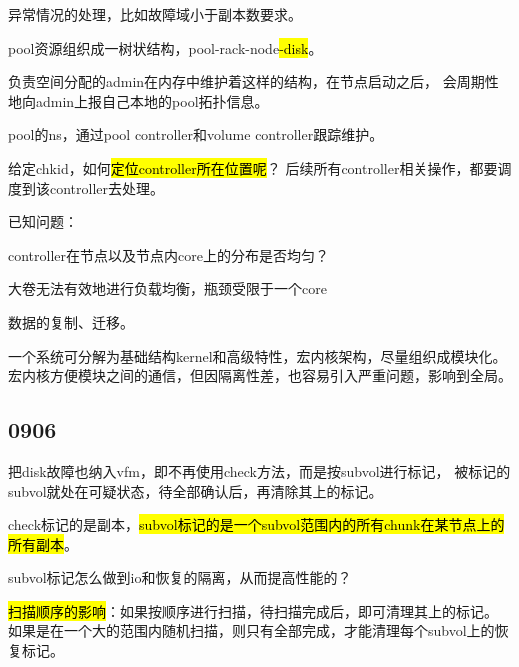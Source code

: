 异常情况的处理，比如故障域小于副本数要求。

pool资源组织成一树状结构，pool-rack-node\hl{-disk}。

负责空间分配的admin在内存中维护着这样的结构，在节点启动之后，
会周期性地向admin上报自己本地的pool拓扑信息。

pool的ns，通过pool controller和volume controller跟踪维护。

给定chkid，如何\hl{定位controller所在位置呢}？
后续所有controller相关操作，都要调度到该controller去处理。

已知问题：
\begin{enumbox}
\item controller在节点以及节点内core上的分布是否均匀？
\item 大卷无法有效地进行负载均衡，瓶颈受限于一个core
\end{enumbox}

数据的复制、迁移。

一个系统可分解为基础结构kernel和高级特性，宏内核架构，尽量组织成模块化。
宏内核方便模块之间的通信，但因隔离性差，也容易引入严重问题，影响到全局。

\subsection{0906}

把disk故障也纳入vfm，即不再使用check方法，而是按subvol进行标记，
被标记的subvol就处在可疑状态，待全部确认后，再清除其上的标记。

check标记的是副本，\hl{subvol标记的是一个subvol范围内的所有chunk在某节点上的所有副本}。

subvol标记怎么做到io和恢复的隔离，从而提高性能的？

\hl{扫描顺序的影响}：如果按顺序进行扫描，待扫描完成后，即可清理其上的标记。
如果是在一个大的范围内随机扫描，则只有全部完成，才能清理每个subvol上的恢复标记。
